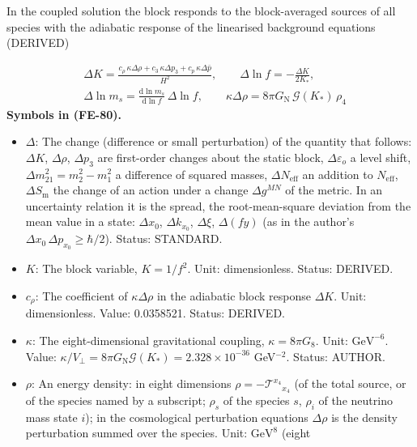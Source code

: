 \documentclass[
  10pt,
]{article}
\providecommand{\tightlist}{%
  \setlength{\itemsep}{0pt}\setlength{\parskip}{0pt}}
\begin{document}
In the coupled solution the block responds to the block-averaged sources
of all species with the adiabatic response of the linearised background
equations (DERIVED)

\[
\begin{aligned}
&\Delta K = \frac{c_\rho\,\kappa\Delta\rho + c_3\,\kappa\Delta p_3 + c_p\,\kappa\Delta\bar p}{H^2},\qquad
 \Delta\ln f = -\frac{\Delta K}{2K_*},\\
&\Delta\ln m_s = \frac{\mathrm{d}\ln m_s}{\mathrm{d}\ln f}\,\Delta\ln f,\qquad
 \kappa\Delta\rho = 8\pi G_{\mathrm{N}}\,\mathcal{G}(K_*)\,\rho_4
\end{aligned} \tag{FE-80}
\] \textbf{Symbols in (FE-80).}

\begin{itemize}
\tightlist
\item
  \(\Delta\): The change (difference or small perturbation) of the
  quantity that follows: \(\Delta K\), \(\Delta\rho\), \(\Delta p_3\)
  are first-order changes about the static block,
  \(\Delta\varepsilon_o\) a level shift,
  \(\Delta m^2_{21} = m_2^2 - m_1^2\) a difference of squared masses,
  \(\Delta N_{\mathrm{eff}}\) an addition to \(N_{\mathrm{eff}}\),
  \(\Delta S_{\mathrm{m}}\) the change of an action under a change
  \(\Delta g^{MN}\) of the metric. In an uncertainty relation it is the
  spread, the root-mean-square deviation from the mean value in a state:
  \(\Delta x_0\), \(\Delta k_{x_0}\), \(\Delta\xi\), \(\Delta(fy)\) (as
  in the author's \(\Delta x_0\,\Delta p_{x_0} \ge \hbar/2\)). Status:
  STANDARD.
\item
  \(K\): The block variable, \(K = 1/f^2\). Unit: dimensionless. Status:
  DERIVED.
\item
  \(c_\rho\): The coefficient of \(\kappa\Delta\rho\) in the adiabatic
  block response \(\Delta K\). Unit: dimensionless. Value: 0.0358521.
  Status: DERIVED.
\item
  \(\kappa\): The eight-dimensional gravitational coupling,
  \(\kappa = 8\pi G_8\). Unit: \(\mathrm{GeV}^{-6}\). Value:
  \(\kappa/V_\perp = 8\pi G_{\mathrm{N}}\mathcal{G}(K_*) = 2.328\times10^{-36}\)
  GeV\(^{-2}\). Status: AUTHOR.
\item
  \(\rho\): An energy density: in eight dimensions
  \(\rho = -\mathcal{T}^{x_4}{}_{x_4}\) (of the total source, or of the
  species named by a subscript; \(\rho_s\) of the species \(s\),
  \(\rho_i\) of the neutrino mass state \(i\)); in the cosmological
  perturbation equations \(\Delta\rho\) is the density perturbation
  summed over the species. Unit: \(\mathrm{GeV}^{8}\) (eight

\end{itemize}
\end{document}
